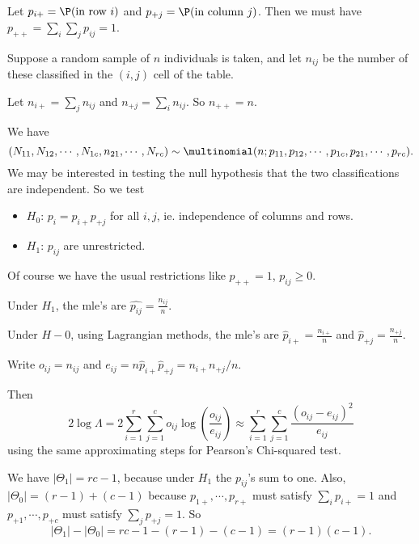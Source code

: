 \documentclass[a4paper]{article}
\begin{document}
Let $p_{i+} = \P(\text{in row }i)$ and $p_{+j} = \P(\text{in column }j)$. Then we must have $p_{++} = \sum_i \sum_j p_{ij} = 1$.

Suppose a random sample of $n$ individuals is taken, and let $n_{ij}$ be the number of these classified in the $(i, j)$ cell of the table.

Let $n_{i+} = \sum_j n_{ij}$ and $n_{+j} = \sum_i n_{ij}$. So $n_{++} = n$.

We have
\[
  (N_{11}, N_{12}, \cdots, N_{1c}, n_{21}, \cdots, N_{rc}) \sim \multinomial (n; p_{11}, p_{12}, \cdots, p_{1c}, p_{21}, \cdots, p_{rc}).
\]
We may be interested in testing the null hypothesis that the two classifications are independent. So we test
\begin{itemize}
  \item $H_0$: $p_i = p_{i+}p_{+j}$ for all $i, j$, ie. independence of columns and rows.
  \item $H_1$: $p_{ij}$ are unrestricted.
\end{itemize}
Of course we have the usual restrictions like $p_{++} = 1$, $p_{ij} \geq 0$.

Under $H_1$, the mle's are $\hat{p_{ij}} = \frac{n_{ij}}{n}$.

Under $H-0$, using Lagrangian methods, the mle's are $\hat{p}_{i+} = \frac{n_{i+}}{n}$ and $\hat{p}_{+j} = \frac{n_{+j}}{n}$.

Write $o_{ij} = n_{ij}$ and $e_{ij} = n\hat{p}_{i+}\hat{p}_{+j} = n_{i+}n_{+j}/n$.

Then
\[
  2\log \Lambda = 2\sum_{i = 1}^r \sum_{j = 1}^c o_{ij}\log\left(\frac{o_{ij}}{e_{ij}}\right) \approx \sum_{i = 1}^r \sum_{j = 1}^c \frac{(o_{ij} - e_{ij})^2}{e_{ij}}
\]
using the same approximating steps for Pearson's Chi-squared test.

We have $|\Theta_1| = rc - 1$, because under $H_1$ the $p_{ij}$'s sum to one. Also, $|\Theta_0| = (r - 1) + (c - 1)$ because $p_{1+}, \cdots, p_{r+}$ must satisfy $\sum_i p_{i+} = 1$ and $p_{+1}, \cdots, p_{+c}$ must satisfy $\sum_j p_{+j} = 1$. So
\[
  |\Theta_1| - |\Theta_0| = rc - 1 - (r - 1) - (c - 1) = (r - 1)(c - 1).
\]
\end{document}
